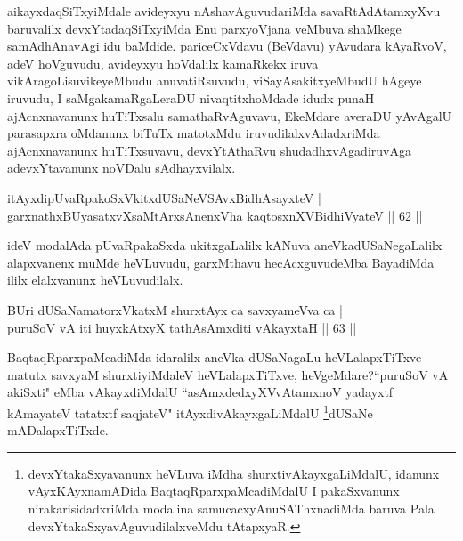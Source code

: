 \begin{artha}
aikayxdaqSiTxyiMdale avideyxyu nAshavAguvudariMda savaRtAdAtamxyXvu baruvalilx devxYtadaqSiTxyiMda Enu parxyoVjana veMbuva shaMkege samAdhAnavAgi idu baMdide. \mdash  pariceCxVdavu (BeVdavu) yAvudara kAyaRvoV, adeV hoVguvudu, avideyxyu hoVdalilx kamaRkekx iruva vikAragoLisuvikeyeMbudu anuvatiRsuvudu, viSayAsakitxyeMbudU hAgeye iruvudu, I saMgakamaRgaLeraDU nivaqtitxhoMdade idudx punaH ajAcnxnavanunx huTiTxsalu samathaRvAguvavu, EkeMdare averaDU yAvAgalU parasapxra oMdanunx biTuTx matotxMdu iruvudilalxvAdadxriMda ajAcnxnavanunx huTiTxsuvavu, devxYtAthaRvu shudadhxvAgadiruvAga adevxYtavanunx noVDalu sAdhayxvilalx.
\end{artha}

\begin{shl}
itAyxdipUvaRpakoSxVkitxdUSaNeVSAvxBidhAsayxteV |\\
garxnathxBUyasatxvXsaMtArxsAnenxVha kaqtosxnXV\s BidhiVyateV \hfill || 62 ||
\end{shl}

\begin{artha}
ideV modalAda pUvaRpakaSxda ukitxgaLalilx kANuva aneVkadUSaNegaLalilx alapxvanenx muMde heVLuvudu, garxMthavu hecAcxguvudeMba BayadiMda ililx elalxvanunx heVLuvudilalx.
\end{artha}


\begin{shl}
BUri dUSaNamatorxVkatxM shurxtAyx ca savxyameVva ca |\\
puruSoV vA iti huyxkAtxyX tathA\s sAmxditi vAkayxtaH \hfill || 63 ||
\end{shl}

\begin{artha}
BaqtaqRparxpaMcadiMda idaralilx aneVka dUSaNagaLu heVLalapxTiTxve matutx savxyaM 
shurxtiyiMdaleV heVLalapxTiTxve, heVgeMdare?``puruSoV vA akiSxti" eMba vAkayxdiMdalU ``asAmxdedxyXV\s \s vAtamxnoV yadayxtf kAmayateV tatatxtf saqjateV" itAyxdivAkayxgaLiMdalU
\footnote{devxYtakaSxyavanunx heVLuva iMdha shurxtivAkayxgaLiMdalU, idanunx vAyxKAyxnamADida BaqtaqRparxpaMcadiMdalU I pakaSxvanunx nirakarisidadxriMda modalina samucacxyAnuSAThxnadiMda baruva Pala  devxYtakaSxyavAguvudilalxveMdu tAtapxyaR.}dUSaNe mADalapxTiTxde.
\end{artha}


